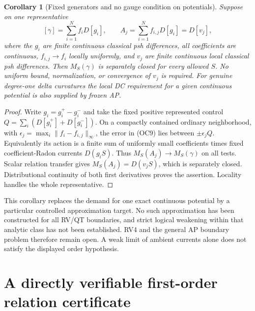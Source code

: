 \documentclass[11pt]{article}
\newtheorem{corollary}[theorem]{Corollary}
\theoremstyle{remark}\newtheorem{remark}[theorem]{Remark}
\begin{document}
\begin{corollary}[Fixed generators and no gauge condition on potentials]
Suppose on one representative
\[
 [\gamma]=\sum_{i=1}^N f_iD[g_i],\qquad
 A_j=\sum_{i=1}^N f_{i,j}D[g_i]=D[v_j],                 \tag{OC9}
\]
where the $g_i$ are finite continuous classical psh differences, all
coefficients are continuous, $f_{i,j}\to f_i$ locally uniformly, and
$v_j$ are finite continuous local classical psh differences. Then
$M_S(\gamma)$ is separately closed for every allowed $S$.
No uniform bound, normalization, or convergence of $v_j$ is required.
For genuine degree-one delta curvatures the local DC requirement for a
given continuous potential is also supplied by frozen AP.
\end{corollary}
\begin{proof}
Write $g_i=g_i^+-g_i^-$ and take the fixed positive represented control
$Q=\sum_i(D[g_i^+]+D[g_i^-])$. On a compactly contained ordinary
neighborhood, with $\epsilon_j=\max_i\|f_i-f_{i,j}\|_\infty$,
the error in (OC9) lies between $\pm\epsilon_jQ$.
Equivalently its action is a finite sum of uniformly small coefficients
times fixed coefficient-Radon currents $D(g_iS)$. Thus
$M_S(A_j)\to M_S(\gamma)$ on all tests. Scalar relation transfer gives
$M_S(A_j)=D(v_jS)$, which is separately closed. Distributional continuity
of both first derivatives proves the assertion. Locality handles the
whole representative.
\end{proof}

This corollary replaces the demand for one exact continuous potential
by a particular controlled approximation target. No such approximation
has been constructed for all RV/QT boundaries, and strict logical
weakening within that analytic class has not been established. RV4 and
the general AP boundary problem therefore remain open. A weak limit of
ambient currents alone does not satisfy the displayed order hypothesis.

\section{A directly verifiable first-order relation certificate}
\end{document}
